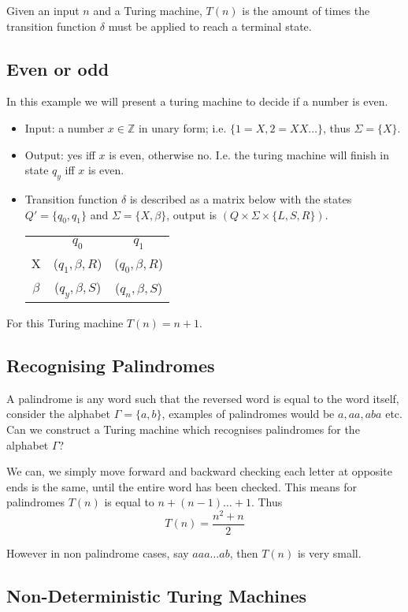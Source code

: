 \begin{definition}
	Given an input $n$ and a Turing machine,
	$T(n)$ is the amount of times the transition function 
	$\delta$ must be applied to reach a terminal state.
\end{definition}

\subsection{Even or odd}
\begin{example}
	In this example we will present a turing machine to decide if a number is even.
	\begin{itemize}
		\item Input: a number $x \in \mathbb{Z}$ in unary form; i.e. $\{1 = X, 2 = XX\dots\}$,
			thus $\Sigma = \{X\}$.
		\item Output: yes iff $x$ is even, otherwise no. I.e. the turing machine will finish
			in state $q_y$ iff $x$ is even.
		\item Transition function $\delta$ is described as a matrix below with the states
			$Q\prime = \{q_0,q_1\}$ and $\Sigma = \{X,\beta\}$,
			output is $(Q \times \Sigma \times \{L,S,R\})$.
		\begin{center}
			\begin{tabular}{ c c c }
					 & $q_0$           & $q_1$           \\
				X    & ($q_1,\beta,R$) & ($q_0,\beta,R$) \\
			 $\beta$ & ($q_y,\beta,S$) & ($q_n,\beta,S$) \\
			\end{tabular}
		\end{center}
	\end{itemize}
	For this Turing machine $T(n) = n + 1$.
\end{example}

\subsection{Recognising Palindromes}

A palindrome is any word such that the reversed word is equal to the word itself,
consider the alphabet $\Gamma = \{a,b\}$, examples of palindromes would be $a, aa, aba$ etc.
Can we construct a Turing machine which recognises palindromes for the alphabet $\Gamma$?

We can, we simply move forward and backward checking each letter at opposite ends is the same,
until the entire word has been checked.
This means for palindromes $T(n)$ is equal to $n + (n - 1) \dots + 1$. Thus
$$T(n) = \frac{n^2 + n}{2}$$

However in non palindrome cases, say $aaa \dots ab$, then $T(n)$ is very small.

\subsection{Non-Deterministic Turing Machines}
